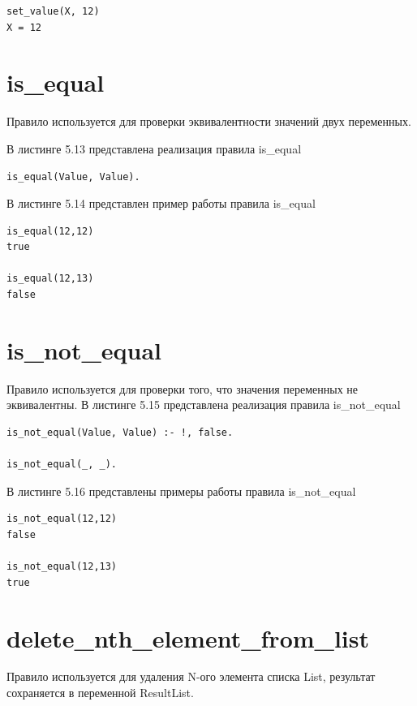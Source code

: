 \documentclass[12pt]{report}
\begin{document}
\begin{lstlisting}[label=some-code, caption=пример работы правила set\_value]
set_value(X, 12)
X = 12
\end{lstlisting}

\section{is\_equal}
Правило используется для проверки эквивалентности значений двух переменных.

В листинге 5.13 представлена реализация правила is\_equal

\begin{lstlisting}[label=some-code, caption=реализация правила is\_equal]
is_equal(Value, Value).
\end{lstlisting}
В листинге 5.14 представлен пример работы правила is\_equal

\begin{lstlisting}[label=some-code, caption=пример работы правила is\_equal]
is_equal(12,12)
true

is_equal(12,13)
false
\end{lstlisting}

\section{is\_not\_equal}
Правило используется для проверки того, что значения переменных не эквивалентны.
В листинге 5.15 представлена реализация правила is\_not\_equal

\begin{lstlisting}[label=some-code, caption=реализация правила is\_not\_equal]
is_not_equal(Value, Value) :- !, false.

is_not_equal(_, _).
\end{lstlisting}
В листинге 5.16 представлены примеры работы  правила is\_not\_equal

\begin{lstlisting}[label=some-code, caption=пример работы правила is\_not\_equal]
is_not_equal(12,12)
false

is_not_equal(12,13)
true
\end{lstlisting}

\section{delete\_nth\_element\_from\_list}
Правило используется для удаления N-ого элемента списка List, результат сохраняется в переменной ResultList. 
\end{document}
